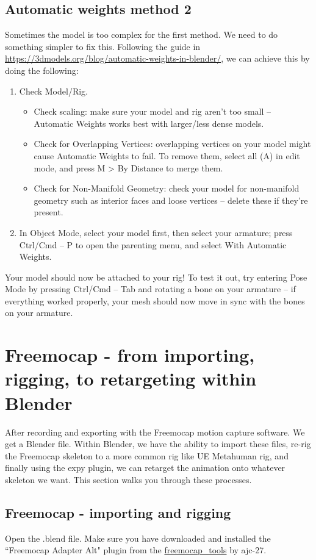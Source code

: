 \documentclass{uva-inf-article}
\begin{document}
\subsection{Automatic weights method 2}
Sometimes the model is too complex for the first method. We need to do something simpler to fix this. Following the guide in \url{https://3dmodels.org/blog/automatic-weights-in-blender/}, we can achieve this by doing the following:
\begin{enumerate}
    \item Check Model/Rig.
    \begin{itemize}
        \item Check scaling: make sure your model and rig aren’t too small – Automatic Weights works best with larger/less dense models.
        \item Check for Overlapping Vertices: overlapping vertices on your model might cause Automatic Weights to fail. To remove them, select all (A) in edit mode, and press M > By Distance to merge them.
        \item Check for Non-Manifold Geometry: check your model for non-manifold geometry such as interior faces and loose vertices – delete these if they’re present.
    \end{itemize}
    \item In Object Mode, select your model first, then select your armature; press Ctrl/Cmd – P to open the parenting menu, and select With Automatic Weights.
\end{enumerate}
Your model should now be attached to your rig! To test it out, try entering Pose Mode by pressing Ctrl/Cmd – Tab and rotating a bone on your armature – if everything worked properly, your mesh should now move in sync with the bones on your armature.

\section{Freemocap - from importing, rigging, to retargeting within Blender}
After recording and exporting with the Freemocap motion capture software. We get a Blender file. Within Blender, we have the ability to import these files, re-rig the Freemocap skeleton to a more common rig like UE Metahuman rig, and finally using the expy plugin, we can retarget the animation onto whatever skeleton we want. This section walks you through these processes.

\subsection{Freemocap - importing and rigging}
Open the .blend file. Make sure you have downloaded and installed the ``Freemocap Adapter Alt" plugin from the \href{https://github.com/ajc27-git/freemocap_tools}{freemocap\_tools} by ajc-27.
\end{document}
